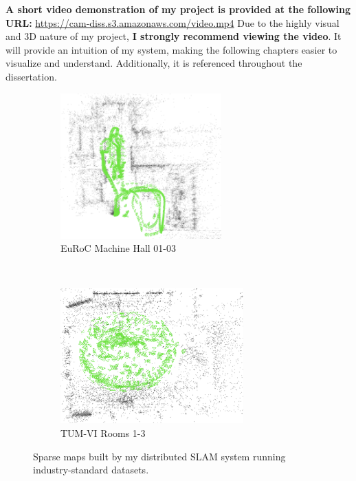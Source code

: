 \begin{leftbar}
    \textbf{A short video demonstration of my project is provided at the following URL:} \url{https://cam-diss.s3.amazonaws.com/video.mp4}  \captionbreak Due to the highly visual and 3D nature of my project, \textbf{I strongly recommend viewing the video}. It will provide an intuition of my system, making the following chapters easier to visualize and understand. Additionally, it is referenced throughout the dissertation.
\end{leftbar}

\begin{figure}[h]
    \centering
    \captionsetup{format=plain}
    \begin{subfigure}[t]{0.475\linewidth}
        \centering
        \includegraphics[height=2.2in]{figures/euroc_mh_map.png}
        \caption{EuRoC Machine Hall 01-03}
    \end{subfigure}\hfill%
    ~
    \begin{subfigure}[t]{0.475\linewidth}
        \centering
        \includegraphics[height=2.05in]{figures/tum_room_map.png}
        \caption{TUM-VI Rooms 1-3}
    \end{subfigure}

    \caption{Sparse maps built by my distributed SLAM system running industry-standard datasets.}
    \label{fig:example-maps}
\end{figure}
